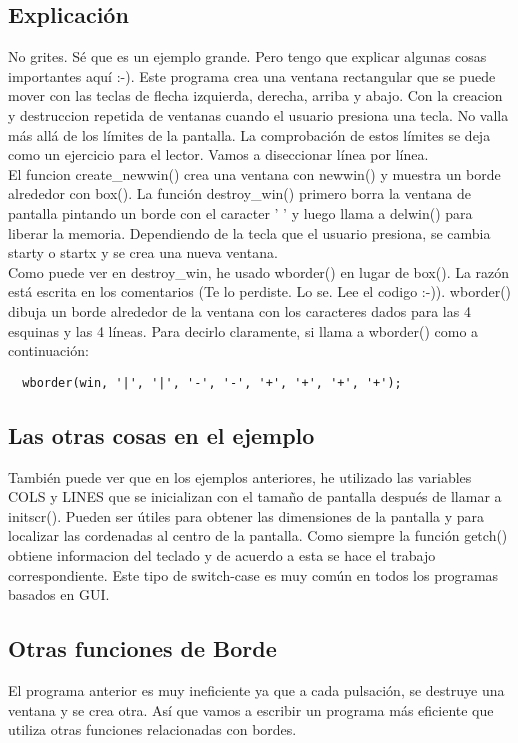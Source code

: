 \documentclass{article}
\begin{document}
\subsection{Explicación}%
No grites. Sé que es un ejemplo grande. Pero tengo que explicar algunas cosas
importantes aquí :-). Este programa crea una ventana rectangular que se puede
mover con las teclas de flecha izquierda, derecha, arriba y abajo. Con la
creacion y destruccion repetida de ventanas cuando el usuario presiona una
tecla. No valla más allá de los límites de la pantalla. La comprobación de
estos límites se deja como un ejercicio para el lector. Vamos a diseccionar
línea por línea.\\

El funcion create\_newwin() crea una ventana con newwin() y muestra un borde
alrededor con box(). La función destroy\_win() primero borra la ventana de
pantalla pintando un borde con el caracter ’ ’ y luego llama a delwin() para
liberar la memoria. Dependiendo de la tecla que el usuario presiona, se cambia
starty o startx y se crea una nueva ventana.\\

Como puede ver en destroy\_win, he usado wborder() en lugar de box(). La razón
está escrita en los comentarios (Te lo perdiste. Lo se. Lee el codigo :-)).
wborder() dibuja un borde alrededor de la ventana con los caracteres dados para
las 4 esquinas y las 4 líneas. Para decirlo claramente, si llama a wborder()
como a continuación:

\begin{verbatim}
  wborder(win, '|', '|', '-', '-', '+', '+', '+', '+');
\end{verbatim}

\subsection{Las otras cosas en el ejemplo}%
También puede ver que en los ejemplos anteriores, he utilizado las variables
COLS y LINES que se inicializan con el tamaño de pantalla después de llamar a
initscr(). Pueden ser útiles para obtener las dimensiones de la pantalla y para
localizar las cordenadas al centro de la pantalla. Como siempre la función
getch() obtiene informacion del teclado y de acuerdo a esta se hace el trabajo
correspondiente. Este tipo de switch-case es muy común en todos los programas
basados en GUI.

\subsection{Otras funciones de Borde}%
El programa anterior es muy ineficiente ya que a cada pulsación, se destruye
una ventana y se crea otra. Así que vamos a escribir un programa más eficiente
que utiliza otras funciones relacionadas con bordes.\\
\end{document}
